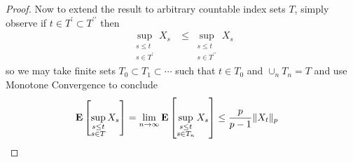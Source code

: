\begin{proof}
Now to extend the result to arbitrary countable index sets $T$, simply
observe if $t \in T^\prime \subset T^{\prime \prime}$ then 
\begin{align*}
\sup_{\substack{s \leq t \\ s \in T^\prime }} X_s &\leq
\sup_{\substack{s \leq t \\ s \in T^{\prime \prime}}} X_s
\end{align*}
so we may take finite sets $T_0 \subset T_1 \subset \cdots$ such that
$t \in T_0$ and $\cup_n T_n = T$ and use Monotone Convergence to
conclude 
\begin{align*}
\textbf{E}\left[\sup_{\substack{s \leq t \\ s \in T }} X_s\right] &= 
\lim_{n \to    \infty} \textbf{E}\left[\sup_{\substack{s \leq t \\ s \in T_n }} X_s\right] \leq 
\frac{p}{p-1}\lVert X_t \rVert_p
\end{align*}
\end{proof}

